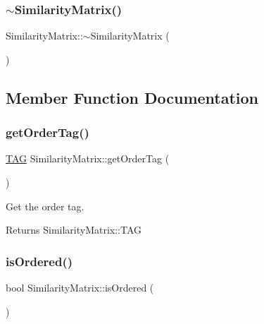 \subsubsection{\texorpdfstring{$\sim$\+Similarity\+Matrix()}{~SimilarityMatrix()}}
{\footnotesize\ttfamily Similarity\+Matrix\+::$\sim$\+Similarity\+Matrix (\begin{DoxyParamCaption}{ }\end{DoxyParamCaption})\hspace{0.3cm}{\ttfamily [virtual]}}



\subsection{Member Function Documentation}
\mbox{\label{class_similarity_matrix_ae4d6b35cecadba128fd8cfbf2b9a0b8c}} 
\subsubsection{\texorpdfstring{get\+Order\+Tag()}{getOrderTag()}}
{\footnotesize\ttfamily \mbox{\hyperlink{class_similarity_matrix_a79098014d74c2cf85f0dd8ad7fc4ac4f}{T\+AG}} Similarity\+Matrix\+::get\+Order\+Tag (\begin{DoxyParamCaption}{ }\end{DoxyParamCaption})}

Get the order tag.

\begin{DoxyReturn}{Returns}
Similarity\+Matrix\+::\+T\+AG 
\end{DoxyReturn}
\mbox{\label{class_similarity_matrix_a7751368aa489720f189c30f9c5e86910}} 
\subsubsection{\texorpdfstring{is\+Ordered()}{isOrdered()}}
{\footnotesize\ttfamily bool Similarity\+Matrix\+::is\+Ordered (\begin{DoxyParamCaption}{ }\end{DoxyParamCaption})}

